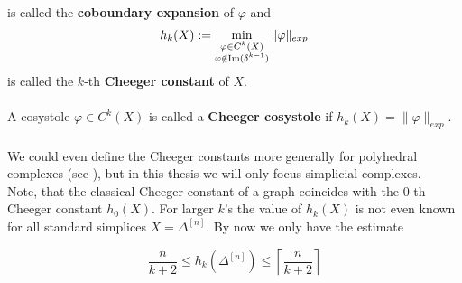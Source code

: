 is called the \textbf{coboundary expansion} of \(\varphi\) and
\[
h_k(X):=\min_{\substack{\varphi\in C^k(X)\\\varphi\notin\mathrm{Im}(\delta^{k-1})}}\|\varphi\|_{exp}
\]
is called the \(k\)-th \textbf{Cheeger constant} of \(X\).\\
\\
A cosystole \(\varphi\in C^k(X)\) is called a \textbf{Cheeger cosystole} if \(h_k(X)=\|\varphi\|_{exp}\).\\
\\
We could even define the Cheeger constants more generally for polyhedral complexes (see \cite{6}), but in this thesis we will only focus simplicial complexes.\\
Note, that the classical Cheeger constant of a graph coincides with the \(0\)-th Cheeger constant \(h_0(X)\). For larger \(k\)'s the value of \(h_k(X)\) is not even known for all standard simplices \(X=\Delta^{[n]}\). By now we only have the estimate

\begin{equation}\label{equation1}
\frac{n}{k+2}\leq h_k(\Delta^{[n]})\leq\left\lceil\frac{n}{k+2}\right\rceil
\end{equation}

